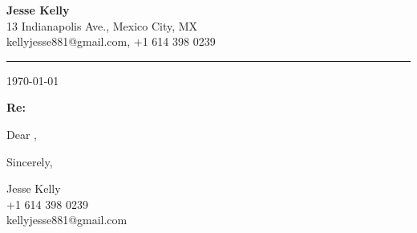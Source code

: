 \documentclass[letterpaper,11pt]{article}
\begin{document}
\begin{center}
\Large\textbf{Jesse Kelly} \\
13 Indianapolis Ave., Mexico City, MX \\
kellyjesse881@gmail.com, +1 614 398 0239
\end{center}
\noindent\rule{\textwidth}{1pt}

\hfill \today

\vspace{2cm}
\textbf{Re: \position}

\vspace{0.5cm}
Dear \contact,


\vspace{0.5cm}

\vspace{0.5cm}


\vspace{2cm}
Sincerely,

\vspace{0.5cm}
Jesse Kelly \\
+1 614 398 0239 \\
kellyjesse881@gmail.com
\end{document}
